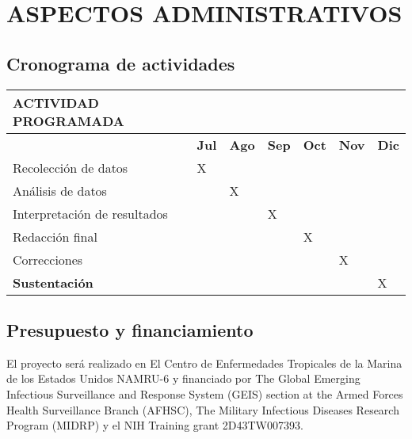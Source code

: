 \documentclass[]{article}
\begin{document}
\section{ASPECTOS ADMINISTRATIVOS}\label{aspectos-administrativos}

\subsection{Cronograma de actividades}\label{cronograma-de-actividades}

\begin{longtable}[]{@{}lllllll@{}}
\toprule
\textbf{ACTIVIDAD PROGRAMADA} & & & & & &\tabularnewline
\midrule
\endhead
& \textbf{Jul} & \textbf{Ago} & \textbf{Sep} & \textbf{Oct} &
\textbf{Nov} & \textbf{Dic}\tabularnewline
Recolección de datos & X & & & & &\tabularnewline
Análisis de datos & & X & & & &\tabularnewline
Interpretación de resultados & & & X & & &\tabularnewline
Redacción final & & & & X & &\tabularnewline
Correcciones & & & & & X &\tabularnewline
\textbf{Sustentación} & & & & & & X\tabularnewline
\bottomrule
\end{longtable}

\subsection{Presupuesto y
financiamiento}\label{presupuesto-y-financiamiento}

El proyecto será realizado en El Centro de Enfermedades Tropicales de la
Marina de los Estados Unidos NAMRU-6 y financiado por The Global
Emerging Infectious Surveillance and Response System (GEIS) section at
the Armed Forces Health Surveillance Branch (AFHSC), The Military
Infectious Diseases Research Program (MIDRP) y el NIH Training grant
2D43TW007393.
\end{document}
